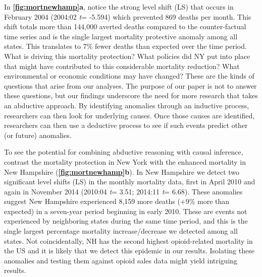 \documentclass[12pt]{article}
\begin{document}
In \textbf{\autoref{fig:mortnewhamp}a}, notice the strong level shift
(LS) that occurs in February 2004 (2004:02 \emph{t}= -5.594) which
prevented 869 deaths per month. This shift totals more than 144,000
averted deaths compared to the counter-factual time series and is the
single largest mortality protective anomaly among all states. This
translates to 7\% fewer deaths than expected over the time period. What
is driving this mortality protection? What policies did NY put into
place that might have contributed to this considerable mortality
reduction? What environmental or economic conditions may have changed?
These are the kinds of questions that arise from our analyses. The
purpose of our paper is not to answer these questions, but our findings
underscore the need for more research that takes an abductive approach.
By identifying anomalies through an inductive process, researchers can
then look for underlying causes. Once those causes are identified,
researchers can then use a deductive process to see if such events
predict other (or future) anomalies.

To see the potential for combining abductive reasoning with causal
inference, contrast the mortality protection in New York with the
enhanced mortality in New Hampshire
(\textbf{\autoref{fig:mortnewhamp}b}). In New Hampshire we detect two
significant level shifts (LS) in the monthly mortality data, first in
April 2010 and again in November 2014 (2010:04 \emph{t}= 3.51; 2014:11
\emph{t}= 6.68). These anomalies suggest New Hampshire experienced 8,159
more deaths (+9\% more than expected) in a seven-year period beginning
in early 2010. These are events not experienced by neighboring states
during the same time period, and this is the single largest percentage
mortality increase/decrease we detected among all states. Not
coincidentally, NH has the second highest opioid-related mortality in
the US \citep{beetham2019access} and it is likely that we detect this
epidemic in our results. Isolating these anomalies and testing them
against opioid sales data might yield intriguing results.
\end{document}
